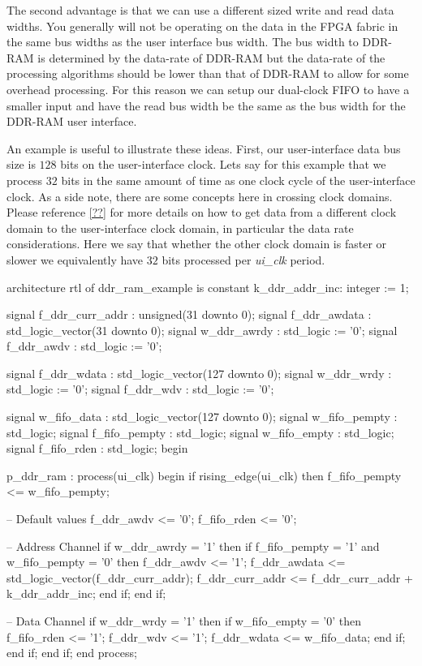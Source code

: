 The second advantage is that we can use a different sized write and read data widths. You generally will not be operating on the data in the \ac{FPGA} fabric in the same bus widths as the user interface bus width. The bus width to \ac{DDR}-\ac{RAM} is determined by the data-rate of \ac{DDR}-\ac{RAM} but the data-rate of the processing algorithms should be lower than that of \ac{DDR}-\ac{RAM} to allow for some overhead processing. For this reason we can setup our dual-clock \ac{FIFO} to have a smaller input and have the read bus width be the same as the bus width for the \ac{DDR}-\ac{RAM} user interface. 

An example is useful to illustrate these ideas. First, our user-interface data bus size is $128$ bits on the user-interface clock. Lets say for this example that we process $32$ bits in the same amount of time as one clock cycle of the user-interface clock. As a side note, there are some concepts here in crossing clock domains. Please reference \ref{??} for more details on how to get data from a different clock domain to the user-interface clock domain, in particular the data rate considerations. Here we say that whether the other clock domain is faster or slower we equivalently have $32$ bits processed per \emph{ui\_clk} period.  

\begin{VHDLlisting}[tabsize=4]
architecture rtl of ddr_ram_example is
	constant k_ddr_addr_inc: integer := 1;
	
	signal f_ddr_curr_addr : unsigned(31 downto 0);
	signal f_ddr_awdata    : std_logic_vector(31 downto 0);
	signal w_ddr_awrdy     : std_logic := '0';
	signal f_ddr_awdv      : std_logic := '0';

	signal f_ddr_wdata     : std_logic_vector(127 downto 0);
	signal w_ddr_wrdy      : std_logic := '0';
	signal f_ddr_wdv       : std_logic := '0';

	signal w_fifo_data     : std_logic_vector(127 downto 0); 
	signal w_fifo_pempty   : std_logic;
	signal f_fifo_pempty   : std_logic;
	signal w_fifo_empty    : std_logic;
	signal f_fifo_rden     : std_logic;	
begin

p_ddr_ram : process(ui_clk)
begin
	if rising_edge(ui_clk) then
		f_fifo_pempty <= w_fifo_pempty;
		
		-- Default values
		f_ddr_awdv <= '0';
		f_fifo_rden <= '0';
		
		-- Address Channel
		if w_ddr_awrdy = '1' then
			if f_fifo_pempty = '1' and w_fifo_pempty = '0' then
				f_ddr_awdv <= '1';
				f_ddr_awdata <= std_logic_vector(f_ddr_curr_addr);
				f_ddr_curr_addr <= f_ddr_curr_addr + k_ddr_addr_inc;
			end if;		
		end if;
		
		-- Data Channel
		if w_ddr_wrdy = '1' then
			if w_fifo_empty = '0' then
				f_fifo_rden <= '1';
				f_ddr_wdv <= '1';
				f_ddr_wdata <= w_fifo_data;
			end if;			
		end if;
	end if;
end process;
\end{VHDLlisting}

